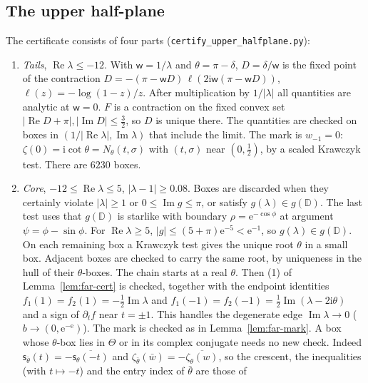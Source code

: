 \documentclass[11pt]{amsart}
\theoremstyle{definition}
\newcommand{\eee}{\mathrm{e}}
\newcommand{\ii}{\mathrm{i}}
\begin{document}
\subsection{The upper half-plane}\label{app:upper}
The certificate consists of four
parts (\texttt{certify\_upper\_halfplane.py}):
\begin{enumerate}
\item[(T)] \emph{Tails}, $\operatorname{Re}\lambda\le-12$.  With $\mathsf w=1/\lambda$ and $\theta=\pi-\delta$, $D=\delta/\mathsf w$ is the
  fixed point of the contraction $D=-(\pi-\mathsf w D)\,\ell(2\ii\mathsf w(\pi-\mathsf w D))$,
  $\ell(z)=-\log(1-z)/z$.  After multiplication by $1/|\lambda|$ all quantities are
  analytic at $\mathsf w=0$.  $F$ is a contraction on the fixed convex set
  $|\operatorname{Re}D+\pi|,|\operatorname{Im}D|\le\tfrac32$, so $D$ is unique there.  The quantities are checked on boxes in $(1/|\operatorname{Re}\lambda|,\operatorname{Im}\lambda)$ that
  include the limit.  The mark is $w_{-1}=0$: $\zeta(0)=\ii\cot\theta=N_\theta(t,\sigma)$ with $(t,\sigma)$
  near $(0,\tfrac12)$, by a scaled Krawczyk test.  There are $6230$ boxes.
\item[(K)] \emph{Core}, $-12\le\operatorname{Re}\lambda\le5$, $|\lambda-1|\ge0.08$.  Boxes are discarded when they
  certainly violate $|\lambda|\ge1$ or $0\le\operatorname{Im}g\le\pi$, or satisfy $g(\lambda)\in g(\mathbb D)$.  The last
  test uses that $g(\mathbb D)$ is starlike with boundary $\rho=\eee^{-\cos\phi}$ at argument
  $\psi=\phi-\sin\phi$.  For $\operatorname{Re}\lambda\ge5$, $|g|\le(5+\pi)\eee^{-5}<\eee^{-1}$, so $g(\lambda)\in g(\mathbb D)$.
  On each remaining box a Krawczyk test gives the unique root $\theta$ in a
  small box.  Adjacent boxes are checked to carry the same root, by uniqueness in
  the hull of their $\theta$-boxes.  The chain starts at a real $\theta$.  Then (1) of
  Lemma~\ref{lem:far-cert} is checked, together with the endpoint identities
  $f_1(1)=f_2(1)=-\tfrac12\operatorname{Im}\lambda$ and $f_1(-1)=f_2(-1)=\tfrac12\operatorname{Im}(\lambda-2\ii\theta)$ and a sign
  of $\partial_tf$ near $t=\pm1$.  This handles the degenerate edge $\operatorname{Im}\lambda\to0$
  ($b\to(0,\eee^{-\eee})$).  The mark is checked as in Lemma~\ref{lem:far-mark}.  A box
  whose $\theta$-box lies in $\Theta$ or in its complex conjugate needs no new check.
  Indeed $\mathsf s_{\bar\theta}(t)=-\overline{\mathsf s_\theta(-t)}$ and $\zeta_{\bar\theta}(\bar w)=-\overline{\zeta_\theta(w)}$, so the
  crescent, the inequalities (with $t\mapsto-t$) and the entry index of $\bar\theta$ are those of

\end{enumerate}
\end{document}
